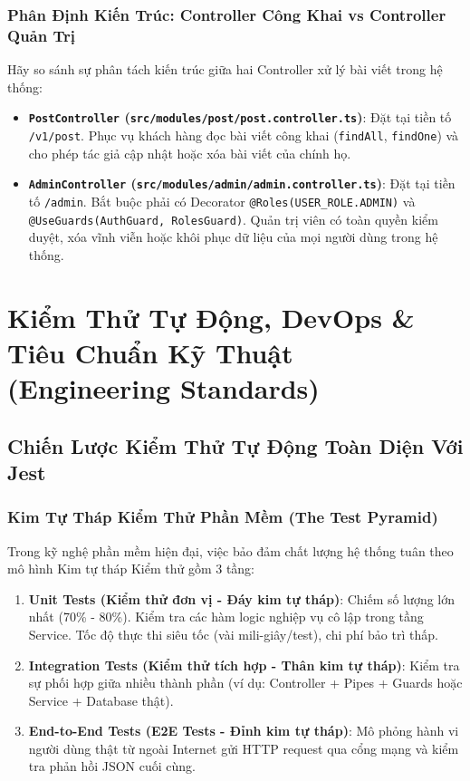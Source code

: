 \documentclass[12pt,a4paper,oneside]{book}
\begin{document}
\section{Phân Định Kiến Trúc: Controller Công Khai vs Controller Quản Trị}
Hãy so sánh sự phân tách kiến trúc giữa hai Controller xử lý bài viết trong hệ thống:
\begin{itemize}
  \item \textbf{\texttt{PostController} (\texttt{src/modules/post/post.controller.ts})}: Đặt tại tiền tố \texttt{/v1/post}. Phục vụ khách hàng đọc bài viết công khai (\texttt{findAll}, \texttt{findOne}) và cho phép tác giả cập nhật hoặc xóa bài viết của chính họ.
  \item \textbf{\texttt{AdminController} (\texttt{src/modules/admin/admin.controller.ts})}: Đặt tại tiền tố \texttt{/admin}. Bắt buộc phải có Decorator \texttt{@Roles(USER\_ROLE.ADMIN)} và \texttt{@UseGuards(AuthGuard, RolesGuard)}. Quản trị viên có toàn quyền kiểm duyệt, xóa vĩnh viễn hoặc khôi phục dữ liệu của mọi người dùng trong hệ thống.
\end{itemize}

\part{Kiểm Thử Tự Động, DevOps \& Tiêu Chuẩn Kỹ Thuật (Engineering Standards)}

\chapter{Chiến Lược Kiểm Thử Tự Động Toàn Diện Với Jest}

\section{Kim Tự Tháp Kiểm Thử Phần Mềm (The Test Pyramid)}
Trong kỹ nghệ phần mềm hiện đại, việc bảo đảm chất lượng hệ thống tuân theo mô hình Kim tự tháp Kiểm thử gồm 3 tầng:
\begin{enumerate}
  \item \textbf{Unit Tests (Kiểm thử đơn vị - Đáy kim tự tháp)}: Chiếm số lượng lớn nhất (70\% - 80\%). Kiểm tra các hàm logic nghiệp vụ cô lập trong tầng Service. Tốc độ thực thi siêu tốc (vài mili-giây/test), chi phí bảo trì thấp.
  \item \textbf{Integration Tests (Kiểm thử tích hợp - Thân kim tự tháp)}: Kiểm tra sự phối hợp giữa nhiều thành phần (ví dụ: Controller + Pipes + Guards hoặc Service + Database thật).
  \item \textbf{End-to-End Tests (E2E Tests - Đỉnh kim tự tháp)}: Mô phỏng hành vi người dùng thật từ ngoài Internet gửi HTTP request qua cổng mạng và kiểm tra phản hồi JSON cuối cùng.
\end{enumerate}
\end{document}
